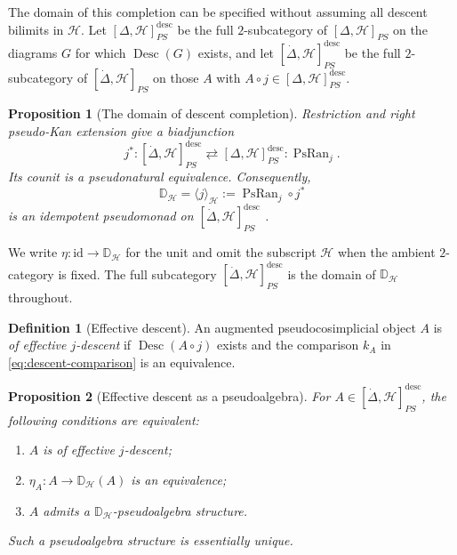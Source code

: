\documentclass[11pt,a4paper]{article}
\numberwithin{equation}{section}
\newtheorem{proposition}[proposition]{Proposition}
\theoremstyle{definition}
\newtheorem{definition}[definition]{Definition}
\theoremstyle{remark}
\newcommand{\id}{\mathrm{id}}
\newcommand{\Hcat}{\mathcal H}
\newcommand{\PsRan}{\operatorname{PsRan}}
\newcommand{\Desc}{\operatorname{Desc}}
\newcommand{\Dmon}{\mathbb D}
\begin{document}
The domain of this completion can be specified without assuming
all descent bilimits in \(\Hcat\).
Let \([\Delta,\Hcat]_{PS}^{\mathrm{desc}}\) be the full
\(2\)-subcategory of \([\Delta,\Hcat]_{PS}\) on the diagrams
\(G\) for which \(\Desc(G)\) exists, and let
\([\dot\Delta,\Hcat]_{PS}^{\mathrm{desc}}\) be the full
\(2\)-subcategory of \([\dot\Delta,\Hcat]_{PS}\) on those \(A\)
with \(A\circ j\in[\Delta,\Hcat]_{PS}^{\mathrm{desc}}\).

\begin{proposition}[The domain of descent completion]
\label{prop:restricted-descent-completion}
Restriction and right pseudo-Kan extension give a biadjunction
\[
  j^*\colon[\dot\Delta,\Hcat]_{PS}^{\mathrm{desc}}
  \rightleftarrows
  [\Delta,\Hcat]_{PS}^{\mathrm{desc}}:\PsRan_j.
\]
Its counit is a pseudonatural equivalence. Consequently,
\begin{equation}
  \Dmon_{\Hcat}=\langle j\rangle_{\Hcat}
  :=\PsRan_j\circ j^*
  \label{eq:descent-pseudomonad}
\end{equation}
is an idempotent pseudomonad on
\([\dot\Delta,\Hcat]_{PS}^{\mathrm{desc}}\)
\cite[Theorem~3.30]{Nunes2018}.
\end{proposition}

We write \(\eta\colon\id\to\Dmon_{\Hcat}\) for the unit and
omit the subscript \(\Hcat\) when the ambient \(2\)-category is
fixed. The full subcategory
\([\dot\Delta,\Hcat]_{PS}^{\mathrm{desc}}\) is the domain of
\(\Dmon_{\Hcat}\) throughout.

\begin{definition}[Effective descent]
\label{def:effective-descent}
An augmented pseudocosimplicial object $A$ is \emph{of effective
$j$-descent} if $\Desc(A\circ j)$ exists and the comparison
$k_A$ in \eqref{eq:descent-comparison} is an equivalence.
\end{definition}

\begin{proposition}[Effective descent as a pseudoalgebra]
\label{prop:effective-descent-pseudoalgebra}
For $A\in[\dot\Delta,\Hcat]_{PS}^{\mathrm{desc}}$, the following
conditions are equivalent:
\begin{enumerate}[label=\textup{(\roman*)},leftmargin=2.7em]
  \item $A$ is of effective $j$-descent;
  \item $\eta_A\colon A\to\Dmon_{\Hcat}(A)$ is an equivalence;
  \item $A$ admits a $\Dmon_{\Hcat}$-pseudoalgebra structure.
\end{enumerate}
Such a pseudoalgebra structure is essentially unique.
\end{proposition}
\end{document}
